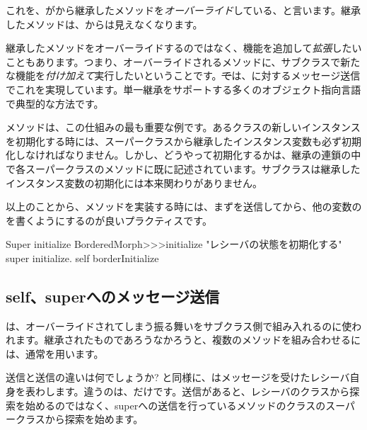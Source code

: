 \documentclass[a4paper,10pt,twoside]{book}
\begin{document}
これを、がから継承したメソッドを\emph{オーバーライド}している、と言います。継承したメソッドは、からは見えなくなります。

継承したメソッドをオーバーライドするのではなく、機能を追加して\emph{拡張}したいこともあります。つまり、オーバーライドされるメソッドに、サブクラスで新たな機能を\emph{付け加えて}実行したいということです。\st では、\super に対するメッセージ送信でこれを実現しています。単一継承をサポートする多くのオブジェクト指向言語で典型的な方法です。

メソッドは、この仕組みの最も重要な例です。あるクラスの新しいインスタンスを初期化する時には、スーパークラスから継承したインスタンス変数も必ず初期化しなければなりません。しかし、どうやって初期化するかは、継承の連鎖の中で各スーパークラスのメソッドに既に記述されています。サブクラスは継承したインスタンス変数の初期化には本来関わりがありません。

以上のことから、メソッドを実装する時には、まずを送信してから、他の変数のを書くようにするのが良いプラクティスです。


\begin{method}[morphinit]{Super initialize}
BorderedMorph>>>initialize
	"レシーバの状態を初期化する"
	super initialize.
	self borderInitialize
\end{method}


\subsection{self、superへのメッセージ送信}

\super{}は、オーバーライドされてしまう振る舞いをサブクラス側で組み入れるのに使われます。継承されたものであろうなかろうと、複数のメソッドを組み合わせるには、通常\self{}を用います。

\self 送信と\super 送信の違いは何でしょうか? \self と同様に、\super はメッセージを受けたレシーバ自身を表わします。違うのは、だけです。\super 送信があると、レシーバのクラスから探索を始めるのではなく、superへの送信を行っているメソッドのクラスのスーパークラスから探索を始めます。
\end{document}
